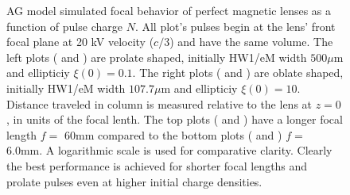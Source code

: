 
\begin{figure}
  \centering
  \centerline{
  }
  \centerline{
  }
  \caption[AG model simulated focal behavior of perfect magnetic lenses as a function of pulse charge $N$]{
    AG model simulated focal behavior of perfect magnetic lenses as a function of pulse charge $N$.
    All plot's pulses begin at the lens' front focal plane at 20 kV velocity ($c/3$) and have the same volume.
    The left plots ( and ) are prolate shaped, initially HW1/eM width $ 500 \mu \text{m}$ and ellipticiy $ \xi ( 0 ) = 0.1 $.
    The right plots ( and ) are oblate shaped, initially HW1/eM width $ 107.7 \mu \text{m}$ and ellipticiy $ \xi ( 0 ) = 10 $.
    Distance traveled in column is measured relative to the lens at $z=0$, in units of the focal lenth.
    The top plots ( and ) have a longer focal length $f = $ 60mm compared to the bottom plots ( and ) $ f = $ 6.0mm.
    A logarithmic scale is used for comparative clarity.
    Clearly the best performance is achieved for shorter focal lengths and prolate pulses even at higher initial charge densities.
  }
  \label{fig:focus_lens_charge}
\end{figure}
